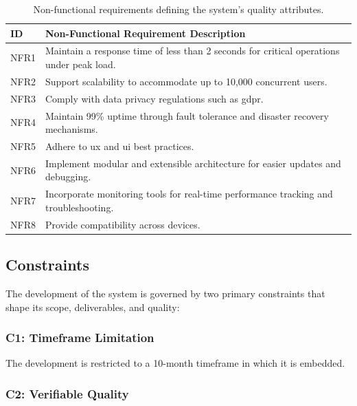 \begin{table}[!htb]
\centering
\begin{tabular}{|p{}|p{}|}
\hline
\textbf{ID} & \textbf{Non-Functional Requirement Description} \\ \hline
NFR1 & Maintain a response time of less than 2 seconds for critical operations under peak load. \\ \hline
NFR2 & Support scalability to accommodate up to 10,000 concurrent users. \\ \hline
NFR3 & Comply with data privacy regulations such as \ac{gdpr}. \\ \hline
NFR4 & Maintain 99\% uptime through fault tolerance and disaster recovery mechanisms. \\ \hline
NFR5 & Adhere to \ac{ux} and \ac{ui} best practices. \\ \hline
NFR6 & Implement modular and extensible architecture for easier updates and debugging. \\ \hline
NFR7 & Incorporate monitoring tools for real-time performance tracking and troubleshooting. \\ \hline
NFR8 & Provide compatibility across devices. \\ \hline
\end{tabular}
\caption[Non-Functional Requirements]{Non-functional requirements defining the system's quality attributes.}
\label{tab:nonfunctional_requirements}
\end{table}



\subsection{Constraints} \label{section:constraints}

The development of the system is governed by two primary constraints that shape its scope, deliverables, and quality:

\subsubsection{C1: Timeframe Limitation}

The development is restricted to a 10-month timeframe in which it is embedded.

\subsubsection{C2: Verifiable Quality}

